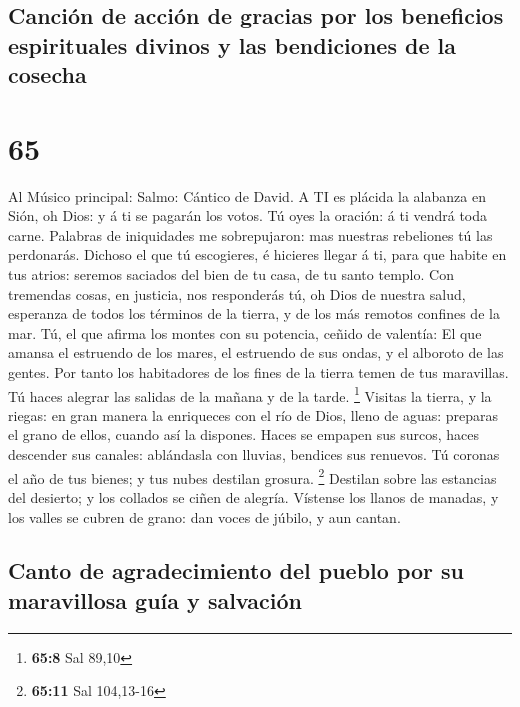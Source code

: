 \hypertarget{canciuxf3n-de-acciuxf3n-de-gracias-por-los-beneficios-espirituales-divinos-y-las-bendiciones-de-la-cosecha}{%
\subsection{Canción de acción de gracias por los beneficios espirituales
divinos y las bendiciones de la
cosecha}\label{canciuxf3n-de-acciuxf3n-de-gracias-por-los-beneficios-espirituales-divinos-y-las-bendiciones-de-la-cosecha}}

\hypertarget{section-64}{%
\section{65}\label{section-64}}

 Al Músico principal: Salmo: Cántico de David. A TI es
plácida la alabanza en Sión, oh Dios: y á ti se pagarán los votos.
 Tú oyes la oración: á ti vendrá toda carne. 
Palabras de iniquidades me sobrepujaron: mas nuestras rebeliones tú las
perdonarás.  Dichoso el que tú escogieres, é hicieres llegar
á ti, para que habite en tus atrios: seremos saciados del bien de tu
casa, de tu santo templo.  Con tremendas cosas, en justicia,
nos responderás tú, oh Dios de nuestra salud, esperanza de todos los
términos de la tierra, y de los más remotos confines de la mar.
 Tú, el que afirma los montes con su potencia, ceñido de
valentía:  El que amansa el estruendo de los mares, el
estruendo de sus ondas, y el alboroto de las gentes.  Por
tanto los habitadores de los fines de la tierra temen de tus maravillas.
Tú haces alegrar las salidas de la mañana y de la tarde. \footnote{\textbf{65:8}
  Sal 89,10}  Visitas la tierra, y la riegas: en gran manera
la enriqueces con el río de Dios, lleno de aguas: preparas el grano de
ellos, cuando así la dispones.  Haces se empapen sus
surcos, haces descender sus canales: ablándasla con lluvias, bendices
sus renuevos.  Tú coronas el año de tus bienes; y tus nubes
destilan grosura. \footnote{\textbf{65:11} Sal 104,13-16} 
Destilan sobre las estancias del desierto; y los collados se ciñen de
alegría.  Vístense los llanos de manadas, y los valles se
cubren de grano: dan voces de júbilo, y aun cantan.

\hypertarget{canto-de-agradecimiento-del-pueblo-por-su-maravillosa-guuxeda-y-salvaciuxf3n}{%
\subsection{Canto de agradecimiento del pueblo por su maravillosa guía y
salvación}\label{canto-de-agradecimiento-del-pueblo-por-su-maravillosa-guuxeda-y-salvaciuxf3n}}

